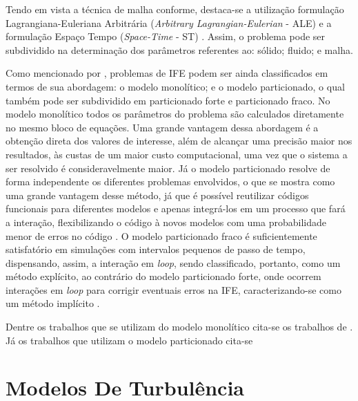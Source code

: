 Tendo em vista a técnica de malha conforme, destaca-se a utilização formulação Lagrangiana-Euleriana Arbitrária (\textit{Arbitrary Lagrangian-Eulerian} - ALE) \cite{donea1982arbitrary,kanchi20073d,fernandes2019ale} e a formulação Espaço Tempo (\textit{Space-Time} - ST) \cite{takizawa2011multiscale,terahara2020heart,takizawa2011stabilized}. Assim, o problema pode ser subdividido na determinação dos parâmetros referentes ao: sólido; fluido; e malha.

Como mencionado por , problemas de IFE podem ser ainda classificados em termos de sua abordagem: o modelo monolítico; e o modelo particionado, o qual também pode ser subdividido em particionado forte e particionado fraco. No modelo monolítico todos os parâmetros do problema são calculados diretamente no mesmo bloco de equações. Uma grande vantagem dessa abordagem é a obtenção direta dos valores de interesse, além de alcançar uma precisão maior nos resultados, às custas de um maior custo computacional, uma vez que o sistema a ser resolvido é consideravelmente maior. Já o modelo particionado resolve de forma independente os diferentes problemas envolvidos, o que se mostra como uma grande vantagem desse método, já que é possível reutilizar códigos funcionais para diferentes modelos e apenas integrá-los em um processo que fará a interação, flexibilizando o código à novos modelos com uma probabilidade menor de erros no código \cite{roux2008domain,hou2012numerical}. O modelo particionado fraco é suficientemente satisfatório em simulações com intervalos pequenos de passo de tempo, dispensando, assim, a interação em \textit{loop}, sendo classificado, portanto, como um método explícito, ao contrário do modelo particionado forte, onde ocorrem interações em \textit{loop} para corrigir eventuais erros na IFE, caracterizando-se como um método implícito \cite{fernandes2020tecnica}.

Dentre os trabalhos que se utilizam do modelo monolítico cita-se os trabalhos de . Já os trabalhos que utilizam o modelo particionado cita-se 

\section{Modelos De Turbulência} \label{MT}

